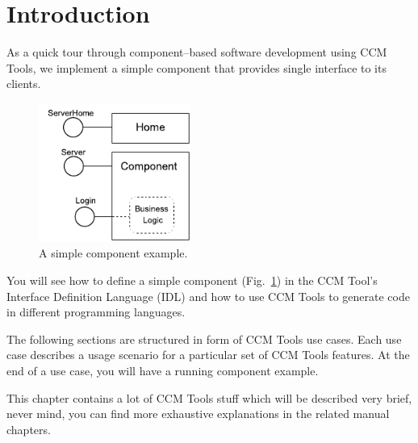 \section{Introduction}
\label{section:Introduction}

As a quick tour through component--based software development using CCM Tools,
we implement a simple component that provides single interface to its clients.

\begin{figure}[htbp]
    \begin{center}
        \includegraphics [width=5cm,angle=0] {figures/LoginComponentExample}
        \caption{ A simple component example.}
        \label{figure:SimpleComponentExample}
    \end{center}
\end{figure}

You will see how to define a simple component
(Fig.~\ref{figure:SimpleComponentExample}) in the CCM Tool's Interface
Definition Language (IDL) and how to use CCM Tools to generate code
in different programming languages.

\vspace{3mm}
The following sections are structured in form of CCM Tools use cases. Each use
case describes a usage scenario for a particular set of CCM Tools features. 
At the end of a use case, you will have a running component example.

\vspace{3mm}
This chapter contains a lot of CCM Tools stuff which will be described very
brief, never mind, you can find more exhaustive 	explanations in the related
manual chapters. 


\newpage


